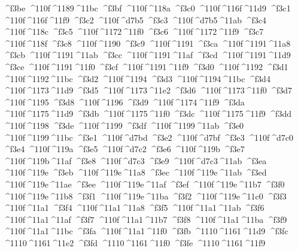 \checkit ^^^^f3be ^^^^110f^^^^1189^^^^11bc
\checkit ^^^^f3bf ^^^^110f^^^^118a
\checkit ^^^^f3c0 ^^^^110f^^^^116f^^^^11d9
\checkit ^^^^f3c1 ^^^^110f^^^^116f^^^^11f9
\checkit ^^^^f3c2 ^^^^110f^^^^d7b5
\checkit ^^^^f3c3 ^^^^110f^^^^d7b5^^^^11ab
\checkit ^^^^f3c4 ^^^^110f^^^^118c
\checkit ^^^^f3c5 ^^^^110f^^^^1172^^^^11f0
\checkit ^^^^f3c6 ^^^^110f^^^^1172^^^^11f9
\checkit ^^^^f3c7 ^^^^110f^^^^118f
\checkit ^^^^f3c8 ^^^^110f^^^^1190
\checkit ^^^^f3c9 ^^^^110f^^^^1191
\checkit ^^^^f3ca ^^^^110f^^^^1191^^^^11a8
\checkit ^^^^f3cb ^^^^110f^^^^1191^^^^11ab
\checkit ^^^^f3cc ^^^^110f^^^^1191^^^^11af
\checkit ^^^^f3cd ^^^^110f^^^^1191^^^^11d9
\checkit ^^^^f3ce ^^^^110f^^^^1191^^^^11f0
\checkit ^^^^f3cf ^^^^110f^^^^1191^^^^11f9
\checkit ^^^^f3d0 ^^^^110f^^^^1192
\checkit ^^^^f3d1 ^^^^110f^^^^1192^^^^11bc
\checkit ^^^^f3d2 ^^^^110f^^^^1194
\checkit ^^^^f3d3 ^^^^110f^^^^1194^^^^11bc
\checkit ^^^^f3d4 ^^^^110f^^^^1173^^^^11d9
\checkit ^^^^f3d5 ^^^^110f^^^^1173^^^^11e2
\checkit ^^^^f3d6 ^^^^110f^^^^1173^^^^11f0
\checkit ^^^^f3d7 ^^^^110f^^^^1195
\checkit ^^^^f3d8 ^^^^110f^^^^1196
\checkit ^^^^f3d9 ^^^^110f^^^^1174^^^^11f9
\checkit ^^^^f3da ^^^^110f^^^^1175^^^^11d9
\checkit ^^^^f3db ^^^^110f^^^^1175^^^^11f0
\checkit ^^^^f3dc ^^^^110f^^^^1175^^^^11f9
\checkit ^^^^f3dd ^^^^110f^^^^1198
\checkit ^^^^f3de ^^^^110f^^^^1199
\checkit ^^^^f3df ^^^^110f^^^^1199^^^^11ab
\checkit ^^^^f3e0 ^^^^110f^^^^1199^^^^11bc
\checkit ^^^^f3e1 ^^^^110f^^^^d7bd
\checkit ^^^^f3e2 ^^^^110f^^^^d7bf
\checkit ^^^^f3e3 ^^^^110f^^^^d7c0
\checkit ^^^^f3e4 ^^^^110f^^^^119a
\checkit ^^^^f3e5 ^^^^110f^^^^d7c2
\checkit ^^^^f3e6 ^^^^110f^^^^119b
\checkit ^^^^f3e7 ^^^^110f^^^^119b^^^^11af
\checkit ^^^^f3e8 ^^^^110f^^^^d7c3
\checkit ^^^^f3e9 ^^^^110f^^^^d7c3^^^^11ab
\checkit ^^^^f3ea ^^^^110f^^^^119e
\checkit ^^^^f3eb ^^^^110f^^^^119e^^^^11a8
\checkit ^^^^f3ec ^^^^110f^^^^119e^^^^11ab
\checkit ^^^^f3ed ^^^^110f^^^^119e^^^^11ae
\checkit ^^^^f3ee ^^^^110f^^^^119e^^^^11af
\checkit ^^^^f3ef ^^^^110f^^^^119e^^^^11b7
\checkit ^^^^f3f0 ^^^^110f^^^^119e^^^^11b8
\checkit ^^^^f3f1 ^^^^110f^^^^119e^^^^11ba
\checkit ^^^^f3f2 ^^^^110f^^^^119e^^^^11c0
\checkit ^^^^f3f3 ^^^^110f^^^^11a1
\checkit ^^^^f3f4 ^^^^110f^^^^11a1^^^^11a8
\checkit ^^^^f3f5 ^^^^110f^^^^11a1^^^^11ab
\checkit ^^^^f3f6 ^^^^110f^^^^11a1^^^^11af
\checkit ^^^^f3f7 ^^^^110f^^^^11a1^^^^11b7
\checkit ^^^^f3f8 ^^^^110f^^^^11a1^^^^11ba
\checkit ^^^^f3f9 ^^^^110f^^^^11a1^^^^11bc
\checkit ^^^^f3fa ^^^^110f^^^^11a1^^^^11f0
\checkit ^^^^f3fb ^^^^1110^^^^1161^^^^11d9
\checkit ^^^^f3fc ^^^^1110^^^^1161^^^^11e2
\checkit ^^^^f3fd ^^^^1110^^^^1161^^^^11f0
\checkit ^^^^f3fe ^^^^1110^^^^1161^^^^11f9

